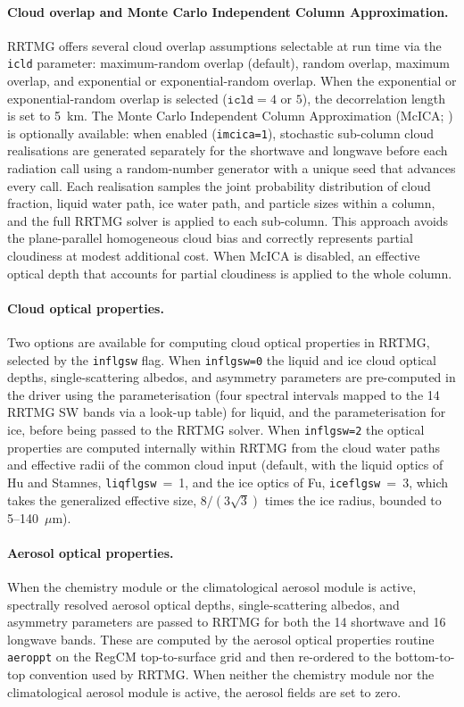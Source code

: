 \paragraph{Cloud overlap and Monte Carlo Independent Column Approximation.}
RRTMG offers several cloud overlap assumptions selectable at run time via
the \texttt{icld} parameter: maximum-random overlap (default), random
overlap, maximum overlap, and exponential or exponential-random overlap.
When the exponential or exponential-random overlap is selected
($\mathtt{icld} = 4$ or $5$), the decorrelation length is set to 5~km.
The Monte Carlo Independent Column Approximation
(McICA; \citealt{Pincus_03}) is optionally available: when enabled
(\texttt{imcica=1}), stochastic sub-column cloud realisations are generated
separately for the shortwave and longwave before each radiation call using
a random-number generator with a unique seed that advances every call.
Each realisation samples the joint probability distribution of cloud
fraction, liquid water path, ice water path, and particle sizes within a
column, and the full RRTMG solver is applied to each sub-column.  This
approach avoids the plane-parallel homogeneous cloud bias and correctly
represents partial cloudiness at modest additional cost.  When McICA is
disabled, an effective optical depth that accounts for partial cloudiness
is applied to the whole column.

\paragraph{Cloud optical properties.}
Two options are available for computing cloud optical properties in RRTMG,
selected by the \texttt{inflgsw} flag.  When \texttt{inflgsw=0} the liquid
and ice cloud optical depths, single-scattering albedos, and asymmetry
parameters are pre-computed in the driver using the \cite{Slingo_89}
parameterisation (four spectral intervals mapped to the 14 RRTMG SW bands
via a look-up table) for liquid, and the \cite{Ebert_92} parameterisation
for ice, before being passed to the RRTMG solver.  When \texttt{inflgsw=2}
the optical properties are computed internally within RRTMG from the cloud
water paths and effective radii of the common cloud input (default, with
the liquid optics of Hu and Stamnes, \texttt{liqflgsw}~=~1, and the ice
optics of Fu, \texttt{iceflgsw}~=~3, which takes the generalized effective
size, $8/(3\sqrt{3})$ times the ice radius, bounded to 5--140~$\mu$m).

\paragraph{Aerosol optical properties.}
When the chemistry module or the climatological aerosol module is active,
spectrally resolved aerosol optical depths, single-scattering albedos, and
asymmetry parameters are passed to RRTMG for both the 14 shortwave and
16 longwave bands.  These are computed by the aerosol optical properties
routine \texttt{aeroppt} on the RegCM top-to-surface grid and then
re-ordered to the bottom-to-top convention used by RRTMG.  When neither the
chemistry module nor the climatological aerosol module is active, the aerosol
fields are set to zero.

